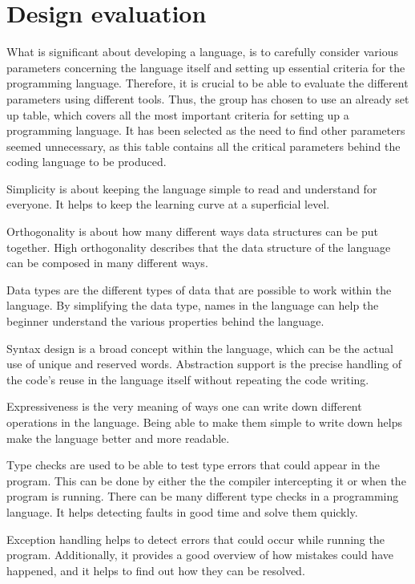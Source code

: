 \section{Design evaluation} \label{chap:design evaluation}
What is significant about developing a language, is to carefully consider various parameters concerning the language itself and setting up essential criteria for the programming language. 
Therefore, it is crucial to be able to evaluate the different parameters using different tools. Thus, the group has chosen to use an already set up table, which covers all the most important criteria for setting up a programming language. 
It has been selected as the need to find other parameters seemed unnecessary, as this table contains all the critical parameters behind the coding language to be produced.






Simplicity is about keeping the language simple to read and understand for everyone. It helps to keep the learning curve at a superficial level.

Orthogonality is about how many different ways data structures can be put together. High orthogonality describes that the data structure of the language can be composed in many different ways.

Data types are the different types of data that are possible to work within the language. By simplifying the data type, names in the language can help the beginner understand the various properties behind the language.

Syntax design is a broad concept within the language, which can be the actual use of unique and reserved words.
Abstraction support is the precise handling of the code's reuse in the language itself without repeating the code writing.

Expressiveness is the very meaning of ways one can write down different operations in the language. Being able to make them simple to write down helps make the language better and more readable.

Type checks are used to be able to test type errors that could appear in the program. This can be done by either the the compiler intercepting it or when the program is running. There can be many different type checks in a programming language. It helps detecting faults in good time and solve them quickly.

Exception handling helps to detect errors that could occur while running the program. Additionally, it provides a good overview of how mistakes could have happened, and it helps to find out how they can be resolved.

